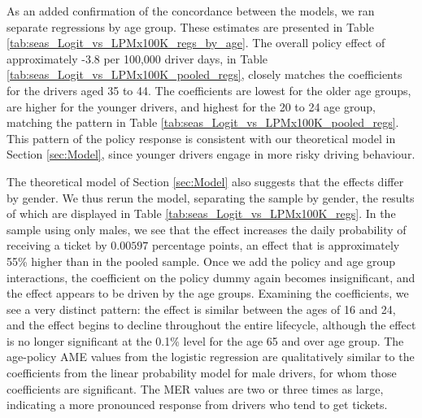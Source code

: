As an added confirmation of the concordance between the models, 
we ran separate regressions by age group. 
These estimates are presented in 
Table \ref{tab:seas_Logit_vs_LPMx100K_regs_by_age}. 
The overall policy effect of approximately -3.8 per 100,000 driver days, 
in Table \ref{tab:seas_Logit_vs_LPMx100K_pooled_regs}, 
closely matches the coefficients for the drivers aged 35 to 44. 
The coefficients are lowest for the older age groups, 
are higher for the younger drivers, 
and highest for the 20 to 24 age group, 
matching the pattern in Table \ref{tab:seas_Logit_vs_LPMx100K_pooled_regs}. 
This pattern of the policy response is consistent 
with our theoretical model in Section \ref{sec:Model}, 
since younger drivers engage in more risky driving behaviour. 



The theoretical model of Section \ref{sec:Model} 
also suggests that the effects differ by gender. 
We thus rerun the model, separating the sample by gender, 
the results of which are displayed in 
Table \ref{tab:seas_Logit_vs_LPMx100K_regs}.
In the sample using only males, 
we see that the effect increases the daily probability of receiving a ticket by $0.00597$ 
percentage points, an effect that is approximately 55\% higher than in the pooled sample. 
Once we add the policy and age group interactions, 
the coefficient on the policy dummy again becomes insignificant, 
and the effect appears to be driven by the age groups. 
Examining the coefficients, we see a very distinct pattern: 
the effect is similar between the ages of 16 and 24, 
and the effect begins to decline throughout the entire lifecycle, 
although the effect is no longer significant at the 0.1\% level for the age 65 and over age group.
% 
The age-policy AME values from the logistic regression 
are qualitatively similar to the coefficients from the linear probability model for male drivers, 
for whom those coefficients are significant. 
The MER values are two or three times as large, 
indicating a more pronounced response from drivers who tend to get tickets. 

